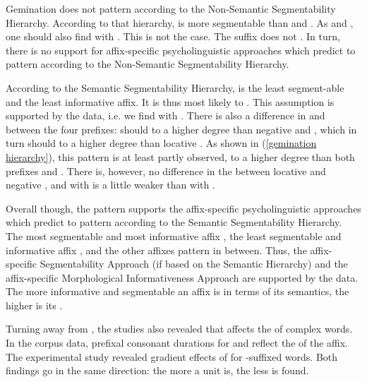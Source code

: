 Gemination does not pattern according to the Non-Semantic Segmentability Hierarchy. According to that hierarchy,  is more segmentable than  and . As  and  , one should also find  with . This is not the case. The suffix  does not .  In turn, there is no support for affix-specific psycholinguistic approaches which predict  to pattern according to the Non-Semantic Segmentability Hierarchy.


According to the Semantic Segmentability Hierarchy,  is the least segment-able and the least informative affix. It is thus most likely to . This assumption is supported by the data, i.e. we find  with . There is also a difference in  and  between the four prefixes:  should  to a higher degree than negative  and , which in turn should  to a higher degree than locative . As shown in (\ref{gemination hierarchy}), this pattern is at least partly observed,   to a higher degree than both prefixes and . There is, however, no difference in the  between locative  and negative , and  with  is a little weaker than  with . 


Overall though, the  pattern supports the affix-specific psycholinguistic approaches which predict  to pattern according to the Semantic Segmentability Hierarchy. The most segmentable and most informative affix  , the least segmentable and informative affix  , and the other affixes pattern in between.
Thus, the affix-specific Segmentability Approach (if based on the Semantic Hierarchy) and the affix-specific Morphological Informativeness Approach are supported by the data. The more informative and segmentable an affix is in terms of its semantics, the higher is its .


Turning away from , the studies also revealed that  affects the  of complex words.
 In the corpus data, prefixal consonant durations for  and  reflect the  of the affix. 
The experimental study revealed gradient effects of  for -suffixed words. 
Both findings go in the same direction: the more  a unit is, the less  is found. 

